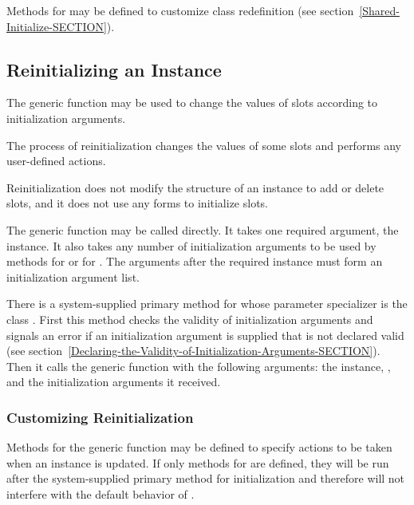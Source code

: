 Methods for  may be defined to customize class
redefinition (see section~\ref{Shared-Initialize-SECTION}).

\subsection{Reinitializing an Instance}
\label{Reinitializing-an-Instance-SECTION}

The generic function  may be used to change
the values of slots according to initialization arguments.

The process of reinitialization changes the values of some slots and
performs any user-defined actions.

Reinitialization does not modify the structure
of an instance to add or delete slots, and it does not use any 
 forms to initialize slots.

The generic function  may be called
directly.  It takes one required argument, the instance.  It also
takes any number of initialization arguments to be used by methods for
 or for . The
arguments after the required instance must form an initialization
argument list.

There is a system-supplied primary method for 
 whose parameter specializer is the class 
.  First this method checks the validity of
initialization arguments and signals an error if an initialization
argument is supplied that is not declared valid (see
section~\ref{Declaring-the-Validity-of-Initialization-Arguments-SECTION}).
Then it calls the generic function 
 with the following arguments: the instance, 
, and the initialization arguments it received.


\subsubsection{Customizing Reinitialization}

Methods for the generic function  may be defined to specify
actions to be taken when an instance is updated.  If only 
methods for  are defined, they will be run
after the system-supplied primary method for initialization and
therefore will not interfere with the default behavior of 
.

